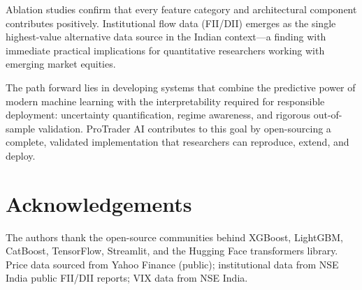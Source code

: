 \documentclass[10pt,a4paper,twoside]{article}
\begin{document}
Ablation studies confirm that every feature category and architectural component
contributes positively. Institutional flow data (FII/DII) emerges as the
single highest-value alternative data source in the Indian context---a finding
with immediate practical implications for quantitative researchers working with
emerging market equities.

The path forward lies in developing systems that combine the predictive power
of modern machine learning with the interpretability required for responsible
deployment: uncertainty quantification, regime awareness, and rigorous
out-of-sample validation. ProTrader AI contributes to this goal by open-sourcing
a complete, validated implementation that researchers can reproduce, extend,
and deploy.

\section*{Acknowledgements}

The authors thank the open-source communities behind XGBoost, LightGBM,
CatBoost, TensorFlow, Streamlit, and the Hugging Face transformers library.
Price data sourced from Yahoo Finance (public); institutional data from
NSE India public FII/DII reports; VIX data from NSE India.



\end{document}

